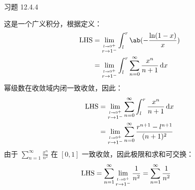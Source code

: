 \begin{problem}
    习题 12.4.4
    \begin{solution}
        这是一个广义积分，根据定义：
        $$
        \begin{aligned}
            \lhs & = \lim_{\stackrel{l \to 0^+}{r \to 1^-}} \int_l^r \ab(-\frac{\ln (1 - x)}{x}) \\
            & = \lim_{\stackrel{l \to 0^+}{r \to 1^-}} \int_l^r \sum_{n = 0}^{\infty} \frac{x^n}{n + 1} \dd{x}
        \end{aligned}
        $$
        幂级数在收敛域内闭一致收敛，因此：
        $$
        \begin{aligned}
            \text{LHS} & = \lim_{\stackrel{l \to 0^+}{r \to 1^-}} \sum_{n = 0}^{\infty} \int_l^r \frac{x^n}{n + 1} \dd{x} \\
            & = \lim_{\stackrel{l \to 0^+}{r \to 1^-}} \sum_{n = 0}^{\infty} \frac{r^{n + 1} - l^{n + 1}}{(n + 1)^2}
        \end{aligned}
        $$
        由于 $\sum\limits_{n = 1}^{\infty} \frac{x^{n}}{n^2}$ 在 $[0, 1]$ 一致收敛，因此极限和求和可交换：
        $$
        \begin{aligned}
            \text{LHS} & = \sum_{n = 1}^{\infty} \lim_{\stackrel{l \to 0^+}{r \to 1^-}} \frac{1}{n^2} = \sum_{n = 1}^{\infty} \frac{1}{n^2}
        \end{aligned}
        $$
    \end{solution}
\end{problem}

